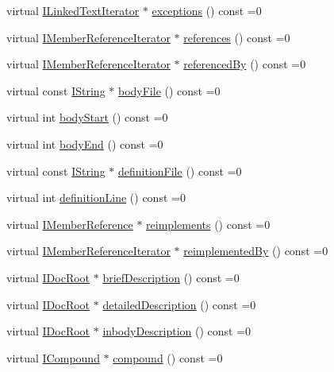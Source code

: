 \begin{DoxyCompactItemize}
\item 
virtual \hyperlink{class_i_linked_text_iterator}{I\+Linked\+Text\+Iterator} $\ast$ \hyperlink{class_i_member_a48fca8accbb372c3df848581ccd18801}{exceptions} () const  =0
\item 
virtual \hyperlink{class_i_member_reference_iterator}{I\+Member\+Reference\+Iterator} $\ast$ \hyperlink{class_i_member_acd69d288806e7cb63198e2b5f0e948ce}{references} () const  =0
\item 
virtual \hyperlink{class_i_member_reference_iterator}{I\+Member\+Reference\+Iterator} $\ast$ \hyperlink{class_i_member_aac1e5a22695c2c0f4f84252073574abc}{referenced\+By} () const  =0
\item 
virtual const \hyperlink{class_i_string}{I\+String} $\ast$ \hyperlink{class_i_member_a58a52b4fbe8e7c3a3bdca1306105e7ae}{body\+File} () const  =0
\item 
virtual int \hyperlink{class_i_member_a3b80e60713001a16807bcced90821411}{body\+Start} () const  =0
\item 
virtual int \hyperlink{class_i_member_a9ed675b0d760678569d05d9664e53ce4}{body\+End} () const  =0
\item 
virtual const \hyperlink{class_i_string}{I\+String} $\ast$ \hyperlink{class_i_member_a08a3b263193b7d79be0db598960cdb76}{definition\+File} () const  =0
\item 
virtual int \hyperlink{class_i_member_a6cf07097311f459830eab9f859365b4e}{definition\+Line} () const  =0
\item 
virtual \hyperlink{class_i_member_reference}{I\+Member\+Reference} $\ast$ \hyperlink{class_i_member_a34347c7caef10a2b738f9c7ee5e0764a}{reimplements} () const  =0
\item 
virtual \hyperlink{class_i_member_reference_iterator}{I\+Member\+Reference\+Iterator} $\ast$ \hyperlink{class_i_member_a24b6115f202192fd33f7adae4b2414a4}{reimplemented\+By} () const  =0
\item 
virtual \hyperlink{class_i_doc_root}{I\+Doc\+Root} $\ast$ \hyperlink{class_i_member_a88e7838b73ef93a6de88899a1e053ed7}{brief\+Description} () const  =0
\item 
virtual \hyperlink{class_i_doc_root}{I\+Doc\+Root} $\ast$ \hyperlink{class_i_member_a2639df9cac5aacfada1f72c88f425ca0}{detailed\+Description} () const  =0
\item 
virtual \hyperlink{class_i_doc_root}{I\+Doc\+Root} $\ast$ \hyperlink{class_i_member_addabc7d8fd182c2ae05c3ffee212c991}{inbody\+Description} () const  =0
\item 
virtual \hyperlink{class_i_compound}{I\+Compound} $\ast$ \hyperlink{class_i_member_adb43a70dd0312813e07b3e6722d397c5}{compound} () const  =0

\end{DoxyCompactItemize}
